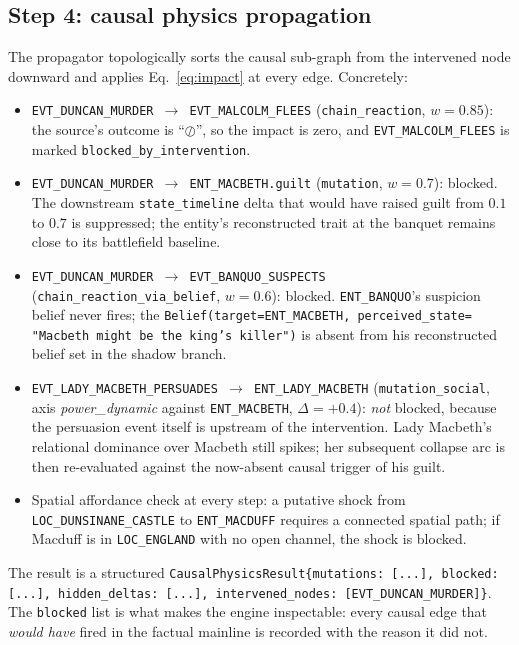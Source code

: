 \documentclass[11pt]{article}
\begin{document}
\subsection{Step 4: causal physics propagation}
\label{app:wk-prop}

The propagator topologically sorts the causal sub-graph from the
intervened node downward and applies Eq.~\ref{eq:impact} at every
edge. Concretely:

\begin{itemize}
\item \texttt{EVT\_DUNCAN\_MURDER $\to$ EVT\_MALCOLM\_FLEES}
      (\texttt{chain\_reaction}, $w=0.85$): the source's outcome
      is ``$\oslash$'', so the impact is zero, and
      \texttt{EVT\_MALCOLM\_FLEES} is marked
      \texttt{blocked\_by\_intervention}.
\item \texttt{EVT\_DUNCAN\_MURDER $\to$ ENT\_MACBETH.guilt}
      (\texttt{mutation}, $w=0.7$): blocked. The downstream
      \texttt{state\_timeline} delta that would have raised guilt
      from $0.1$ to $0.7$ is suppressed; the entity's reconstructed
      trait at the banquet remains close to its battlefield baseline.
\item \texttt{EVT\_DUNCAN\_MURDER $\to$ EVT\_BANQUO\_SUSPECTS}
      (\texttt{chain\_reaction\_via\_belief}, $w=0.6$):
      blocked. \texttt{ENT\_BANQUO}'s suspicion belief never fires;
      the \texttt{Belief(target=ENT\_MACBETH, perceived\_state=
      "Macbeth might be the king's killer")} is absent from his
      reconstructed belief set in the shadow branch.
\item \texttt{EVT\_LADY\_MACBETH\_PERSUADES $\to$
      ENT\_LADY\_MACBETH} (\texttt{mutation\_social}, axis
      \textit{power\_dynamic} against \texttt{ENT\_MACBETH},
      $\Delta=+0.4$): \emph{not} blocked, because the persuasion
      event itself is upstream of the intervention. Lady
      Macbeth's relational dominance over Macbeth still spikes;
      her subsequent collapse arc is then re-evaluated against
      the now-absent causal trigger of his guilt.
\item Spatial affordance check at every step: a putative shock
      from \texttt{LOC\_DUNSINANE\_CASTLE} to \texttt{ENT\_MACDUFF}
      requires a connected spatial path; if Macduff is in
      \texttt{LOC\_ENGLAND} with no open channel, the shock is
      blocked.
\end{itemize}

The result is a structured
\texttt{CausalPhysicsResult\{mutations: [...],
blocked: [...], hidden\_deltas: [...], intervened\_nodes:
[EVT\_DUNCAN\_MURDER]\}}. The \texttt{blocked} list is what
makes the engine inspectable: every causal edge that \emph{would
have} fired in the factual mainline is recorded with the reason it
did not.
\end{document}
